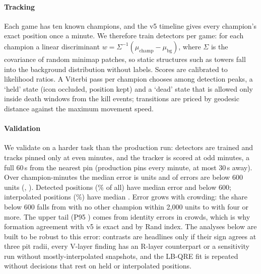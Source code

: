 \paragraph*{Tracking}
Each game has ten known champions, and the v5 timeline gives every champion's exact position once a minute.
We therefore train detectors per game: for each champion a linear discriminant $w=\Sigma^{-1}(\mu_{\mathrm{champ}}-\mu_{\mathrm{bg}})$, where $\Sigma$ is the covariance of random minimap patches, so static structures such as towers fall into the background distribution without labels.
Scores are calibrated to likelihood ratios.
A Viterbi pass per champion chooses among detection peaks, a `held' state (icon occluded, position kept) and a `dead' state that is allowed only inside death windows from the kill events; transitions are priced by geodesic distance against the maximum movement speed.


\paragraph*{Validation}
We validate on a harder task than the production run: detectors are trained and tracks pinned only at even minutes, and the tracker is scored at odd minutes, a full 60\,s from the nearest pin (production pins every minute, at most 30\,s away).
Over  champion-minutes the median error is  units and  of errors are below 600 units (, ).
Detected positions (\% of all) have median error  and  below 600; interpolated positions (\%) have median .
Error grows with crowding: the share below 600 falls from  with no other champion within 2,000 units to  with four or more.
The upper tail (P95 ) comes from identity errors in crowds, which is why formation agreement with v5 is  exact and  by Rand index.
The analyses below are built to be robust to this error: contrasts are headlines only if their sign agrees at three pit radii, every V-layer finding has an R-layer counterpart or a sensitivity run without mostly-interpolated snapshots, and the LB-QRE fit is repeated without decisions that rest on held or interpolated positions.



